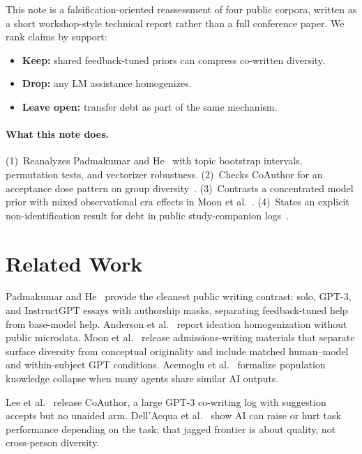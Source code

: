 \documentclass[11pt]{article}
\begin{document}
This note is a falsification-oriented reassessment of four public corpora, written as a short workshop-style technical report rather than a full conference paper.
We rank claims by support:
\begin{itemize}
  \item \textbf{Keep:} shared feedback-tuned priors can compress co-written diversity.
  \item \textbf{Drop:} any LM assistance homogenizes.
  \item \textbf{Leave open:} transfer debt as part of the same mechanism.
\end{itemize}

\paragraph{What this note does.}
(1)~Reanalyzes Padmakumar and He~\citep{padmakumar2024diversity} with topic bootstrap intervals, permutation tests, and vectorizer robustness.
(2)~Checks CoAuthor for an acceptance dose pattern on group diversity~\citep{lee2022coauthor}.
(3)~Contrasts a concentrated model prior with mixed observational era effects in Moon et al.~\citep{moon2026disjunction,osfyd94z2026}.
(4)~States an explicit non-identification result for debt in public study-companion logs~\citep{simsek2025companion,osfswytk2025}.

\section{Related Work}

Padmakumar and He~\citep{padmakumar2024diversity} provide the cleanest public writing contrast: solo, GPT-3, and InstructGPT essays with authorship masks, separating feedback-tuned help from base-model help.
Anderson et al.~\citep{anderson2024homogenization} report ideation homogenization without public microdata.
Moon et al.~\citep{moon2026disjunction,osfyd94z2026} release admissions-writing materials that separate surface diversity from conceptual originality and include matched human--model and within-subject GPT conditions.
Acemoglu et al.~\citep{acemoglu2026collapse} formalize population knowledge collapse when many agents share similar AI outputs.

Lee et al.~\citep{lee2022coauthor} release CoAuthor, a large GPT-3 co-writing log with suggestion accepts but no unaided arm.
Dell'Acqua et al.~\citep{dellacqua2025frontier} show AI can raise or hurt task performance depending on the task; that jagged frontier is about quality, not cross-person diversity.
\end{document}
